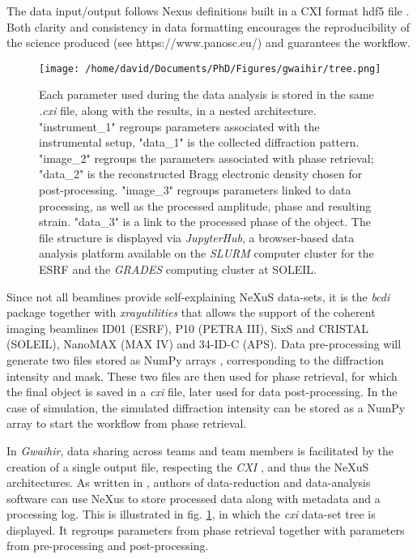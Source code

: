 The data input/output follows Nexus definitions \parencite{Konnecke2015} built in a CXI format hdf5 file \parencite{Maia2012}.
Both clarity and consistency in data formatting encourages the reproducibility of the science produced (see https://www.panosc.eu/) and guarantees the workflow.

\begin{figure}[!htb]
    \centering
    \texttt{[image: /home/david/Documents/PhD/Figures/gwaihir/tree.png]}
    \caption{
    Each parameter used during the data analysis is stored in the same \textit{.cxi} file, along with the results, in a  nested architecture.
    "instrument\_1" regroups parameters associated with the instrumental setup, "data\_1" is the collected diffraction pattern.
    "image\_2" regroups the parameters associated with phase retrieval; "data\_2" is the reconstructed Bragg electronic density chosen for post-processing.
    "image\_3" regroups parameters linked to data processing, as well as the processed amplitude, phase and resulting strain. "data\_3" is a link to the processed phase of the object.
    The file structure is displayed via \textit{JupyterHub}, a browser-based data analysis platform available on the \textit{SLURM} computer cluster for the ESRF and the \textit{GRADES} computing cluster at SOLEIL.
    }
    \label{fig:TREE}
\end{figure}

Since not all beamlines provide self-explaining NeXuS data-sets, it is the \textit{bcdi} package together with \textit{xrayutilities} \cite{kriegner_xrayutilities_2013} that allows the support of the coherent imaging beamlines ID01 (ESRF), P10 (PETRA III), SixS and CRISTAL (SOLEIL), NanoMAX (MAX IV) and 34-ID-C (APS).
Data pre-processing will generate two files stored as NumPy arrays \cite{NumPy}, corresponding to the diffraction intensity and mask.
These two files are then used for phase retrieval, for which the final object is saved in a \textit{cxi} file, later used for data post-processing.
In the case of simulation, the simulated diffraction intensity can be stored as a NumPy array to start the workflow from phase retrieval.

In \textit{Gwaihir}, data sharing across teams and team members is facilitated by the creation of a single output file, respecting the \textit{CXI} \cite{Maia2012}, and thus the NeXuS \cite{Konnecke2015} architectures.
As written in \cite{Konnecke2015}, authors of data-reduction and data-analysis software can use NeXus to store processed data along with metadata and a processing log. This is illustrated in fig. \ref{fig:TREE}, in which the \textit{cxi} data-set tree is displayed. It regroups parameters from phase retrieval together with parameters from pre-processing and post-processing.

